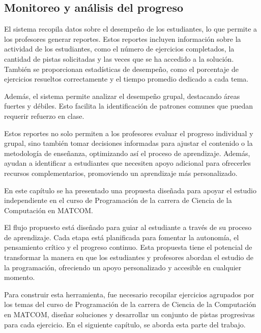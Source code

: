 \documentclass{article}
\begin{document}
\subsection{Monitoreo y análisis del progreso}

El sistema recopila datos sobre el desempeño de los estudiantes, lo que permite a los profesores generar reportes. Estos reportes incluyen información sobre la actividad de los estudiantes, como el número de ejercicios completados, la cantidad de pistas solicitadas y las veces que se ha accedido a la solución. También se proporcionan estadísticas de desempeño, como el porcentaje de ejercicios resueltos correctamente y el tiempo promedio dedicado a cada tema.

Además, el sistema permite analizar el desempeño grupal, destacando áreas fuertes y débiles. Esto facilita la identificación de patrones comunes que puedan requerir refuerzo en clase. 

Estos reportes no solo permiten a los profesores evaluar el progreso individual y grupal, sino también tomar decisiones informadas para ajustar el contenido o la metodología de enseñanza, optimizando así el proceso de aprendizaje. Además, ayudan a identificar a estudiantes que necesiten apoyo adicional para ofrecerles recursos complementarios, promoviendo un aprendizaje más personalizado.

En este capítulo se ha presentado una propuesta diseñada para apoyar el estudio independiente en el curso de Programación de la carrera de Ciencia de la Computación en \mbox{MATCOM}.

El flujo propuesto está diseñado para guiar al estudiante a través de su proceso de aprendizaje. Cada etapa está planificada para fomentar la autonomía, el pensamiento crítico y el progreso continuo. Esta propuesta tiene el potencial de transformar la manera en que los estudiantes y profesores abordan el estudio de la programación, ofreciendo un apoyo personalizado y accesible en cualquier momento.

Para construir esta herramienta, fue necesario recopilar ejercicios agrupados por los temas del curso de Programación de la carrera de Ciencia de la Computación en \mbox{MATCOM}, diseñar soluciones y desarrollar un conjunto de pistas progresivas para cada ejercicio. En el siguiente capítulo, se aborda esta parte del trabajo.
\end{document}
